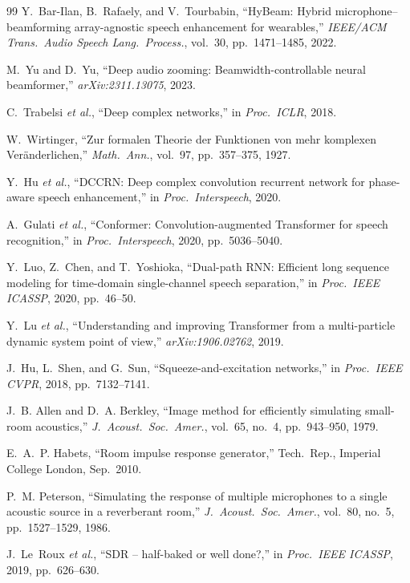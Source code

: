 \documentclass[journal,10pt]{IEEEtran}
\begin{document}
\begin{thebibliography}{99}
 Y.~Bar-Ilan, B.~Rafaely, and V.~Tourbabin, ``HyBeam: Hybrid microphone--beamforming array-agnostic speech enhancement for wearables,'' \emph{IEEE/ACM Trans.\ Audio Speech Lang.\ Process.}, vol.~30, pp.~1471--1485, 2022.

 M.~Yu and D.~Yu, ``Deep audio zooming: Beamwidth-controllable neural beamformer,'' \emph{arXiv:2311.13075}, 2023.

 C.~Trabelsi \emph{et al.}, ``Deep complex networks,'' in \emph{Proc.\ ICLR}, 2018.

 W.~Wirtinger, ``Zur formalen Theorie der Funktionen von mehr komplexen Veränderlichen,'' \emph{Math.\ Ann.}, vol.~97, pp.~357--375, 1927.

 Y.~Hu \emph{et al.}, ``DCCRN: Deep complex convolution recurrent network for phase-aware speech enhancement,'' in \emph{Proc.\ Interspeech}, 2020.

 A.~Gulati \emph{et al.}, ``Conformer: Convolution-augmented Transformer for speech recognition,'' in \emph{Proc.\ Interspeech}, 2020, pp.~5036--5040.

 Y.~Luo, Z.~Chen, and T.~Yoshioka, ``Dual-path RNN: Efficient long sequence modeling for time-domain single-channel speech separation,'' in \emph{Proc.\ IEEE ICASSP}, 2020, pp.~46--50.

 Y.~Lu \emph{et al.}, ``Understanding and improving Transformer from a multi-particle dynamic system point of view,'' \emph{arXiv:1906.02762}, 2019.

 J.~Hu, L.~Shen, and G.~Sun, ``Squeeze-and-excitation networks,'' in \emph{Proc.\ IEEE CVPR}, 2018, pp.~7132--7141.

 J.~B. Allen and D.~A. Berkley, ``Image method for efficiently simulating small-room acoustics,'' \emph{J.\ Acoust.\ Soc.\ Amer.}, vol.~65, no.~4, pp.~943--950, 1979.

 E.~A.~P. Habets, ``Room impulse response generator,'' Tech.\ Rep., Imperial College London, Sep.\ 2010.

 P.~M. Peterson, ``Simulating the response of multiple microphones to a single acoustic source in a reverberant room,'' \emph{J.\ Acoust.\ Soc.\ Amer.}, vol.~80, no.~5, pp.~1527--1529, 1986.

 J.~Le~Roux \emph{et al.}, ``SDR -- half-baked or well done?,'' in \emph{Proc.\ IEEE ICASSP}, 2019, pp.~626--630.


\end{thebibliography}
\end{document}
